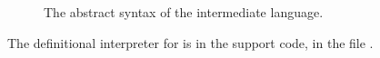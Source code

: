 \documentclass[7x10,nocrop]{TimesAPriori_MIT}%
\begin{document}
{\begin{figure}[tbp]
\caption{The abstract syntax of the \LangCVar{} intermediate language.}
\label{fig:c0-syntax}
\end{figure}

The definitional interpreter for \LangCVar{} is in the support code,
in the file .

\fi}
\end{document}

